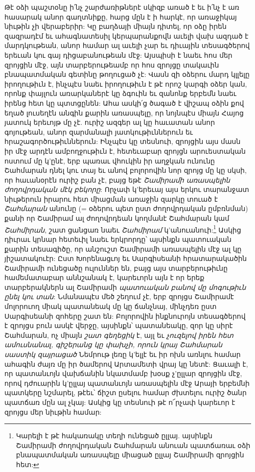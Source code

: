 \documentclass{article}
\begin{document}
{Թէ օձի պաշտօնը ի՛նչ շարժառիթներէ սկիզբ առած է եւ ի՛նչ է առ հասարակ անոր գաղտնիքը, հարց մըն է ի հարկէ, որ առաջիկայ նիւթին չի վերաբերիր: Կը բաղձայի միայն դիտել, որ օձը իրեն զազրադէմ եւ ահագնատեսիլ կերպարանքովն աւելի վախ ազդած է մարդկութեան, անոր համար ալ աւելի չար եւ դիւային տեսագծերով երեւան կու գայ դիցաբանութեան մէջ: Այսպիսի է նաեւ հոս մեր զրոյցին մէջ, այն տարբերութեամբ որ հոս զրոյցը տակաւին բնապատմական գետինը թողուցած չէ: Վասն զի օձերու մարդ կլլելը իրողութիւն է, ինչպէս նաեւ իրողութիւն է թէ որոշ կարգի օձեր կան, որոնք փայլուն առարկաներէ կը ձգուին եւ զանոնք երբեմն նաեւ իրենց հետ կը պտտցընեն: Ահա ասկի՛ց ծագած է վիշապ օձին քով եղած լուսեղէն անգին քարին առասպելը, որ նոյնպէս միայն Հայոց յատուկ երեւոյթ մը չէ. ուրիշ ազգեր ալ կը հաւատան անոր գոյութեան, անոր զարմանալի յատկութիւններուն եւ հրաշագործութիւններուն: Ինչպէս կը տեսնուի, զրոյցին այս մասն իր մէջ արդէն ամբողջութիւն է, հետեւաբար զրոյցն արուեստական ոստում մը կ'ընէ, երբ պառաւ վհուկին իր աղջկան ունունը Շահմարան դնել կու տայ եւ անով բոլորովին նոր զրոյց մը կը սկսի, որ հաւանօրէն ուրիշ բան չէ, բայց եթէ \emph{Շամիրամի առասպելին ժողովրդական մէկ բեկորը}: Որչափ կ'երեւայ այս երկու տարանջատ նիւթերուն իրարու հետ միացման առաջին զարկը տուած է \emph{Շահմարան} անունը (= օձերու պետ ըստ ժողովրդական ըմբռնման) քանի որ Շամիրամ ալ ժողովրդեան կողմանէ Շահմարան կամ \emph{Շահմիրան}, շատ ցանցառ նաեւ \emph{Շահմիրամ} կ'անուանուի:\footnote{Կարելի է թէ հակառակը տեղի ունեցած ըլլայ. այսինքն Շամիրամի ժողովրդական Շահմարան անուան պատճառաւ օձի բնապատմական առասպելը միացած ըլլայ Շամիրամի զրոյցին հետ:} Ասկից դիւրաւ կրնար հետեւիլ նաեւ երկրորդը՝ այսինքն պատուական քարին տեսագիծը, որ անշուշտ Շամիրամի առասպելին մէջ ալ կը յիշատակուէր: Ըստ Խորենացւոյ եւ Սարգիսեանի հրատարակածին Շամիրամի ունեցածը ուլուններ են, բայց այս տարբերութիւնը համեմատաբար աննշանակ է, կարեւորն այն է որ երեք տարբերակներն ալ Շամիրամի \emph{պատուական բանով մը մոգութիւն ընել կու տան}: Նմանապէս մեծ շեղում չէ, երբ զրոյցս Շամիրամէ մոլորուող միակ պատանեակ մը կը ճանչնայ, մինչդեռ ըստ Սարգիսեանի զոհերը շատ են: Բոլորովին ինքնուրոյն տեսագծերով է զրոյցս բուն ասկէ վերջը, այսինքն՝ պատանեակը, զոր կը սիրէ Շահմարան, ոչ միայն \emph{շատ գեղեցիկ} է, այլ եւ \emph{չուզելով իրեն հետ ամուսնանալ, գիշերանց կը փախչի, որուն կրայ Շահմարան սաստիկ զայրացած} Նեմրութ լեռը կ'ելլէ եւ իր ոխն առնլու համար ահագին ժայռ մը իր ծամերով Արտամետի վրայ կը նետէ: Ցաւալի է, որ պատանւոյն վախճանին նկատմամբ խօսք չ'ըլլար զրոյցին մէջ, որով դժուարին կ'ըլլայ պատանւոյն առասպելին մէջ Արայի երբեմնի պատկերը նշմարել, թէեւ՝ ճիշտ ըսելու համար ժխտելու ուրիշ ծանր պատճառ մըն ալ չկայ: Ասկից կը տեսնուի թէ ո՜րչափ կարեւոր է զրոյցս մեր նիւթին համար:

}
\end{document}
